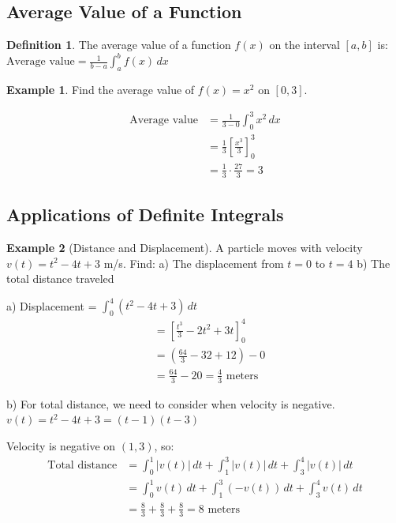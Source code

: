 \documentclass[12pt,a4paper]{book}
\theoremstyle{definition}
\newtheorem{definition}{Definition}[chapter]
\newtheorem{example}{Example}[chapter]
\begin{document}
\subsection{Average Value of a Function}

\begin{definition}
The average value of a function $f(x)$ on the interval $[a,b]$ is:
$\text{Average value} = \frac{1}{b-a} \int_a^b f(x) \, dx$
\end{definition}

\begin{example}
Find the average value of $f(x) = x^2$ on $[0, 3]$.

\begin{align}
\text{Average value} &= \frac{1}{3-0} \int_0^3 x^2 \, dx\\
&= \frac{1}{3} \left[ \frac{x^3}{3} \right]_0^3\\
&= \frac{1}{3} \cdot \frac{27}{3} = 3
\end{align}
\end{example}

\subsection{Applications of Definite Integrals}

\begin{example}[Distance and Displacement]
A particle moves with velocity $v(t) = t^2 - 4t + 3$ m/s. Find:
a) The displacement from $t = 0$ to $t = 4$
b) The total distance traveled

a) Displacement = $\int_0^4 (t^2 - 4t + 3) \, dt$
\begin{align}
&= \left[ \frac{t^3}{3} - 2t^2 + 3t \right]_0^4\\
&= \left(\frac{64}{3} - 32 + 12\right) - 0\\
&= \frac{64}{3} - 20 = \frac{4}{3} \text{ meters}
\end{align}

b) For total distance, we need to consider when velocity is negative.
$v(t) = t^2 - 4t + 3 = (t-1)(t-3)$

Velocity is negative on $(1,3)$, so:
\begin{align}
\text{Total distance} &= \int_0^1 |v(t)| \, dt + \int_1^3 |v(t)| \, dt + \int_3^4 |v(t)| \, dt\\
&= \int_0^1 v(t) \, dt + \int_1^3 (-v(t)) \, dt + \int_3^4 v(t) \, dt\\
&= \frac{8}{3} + \frac{8}{3} + \frac{8}{3} = 8 \text{ meters}
\end{align}
\end{example}
\end{document}

